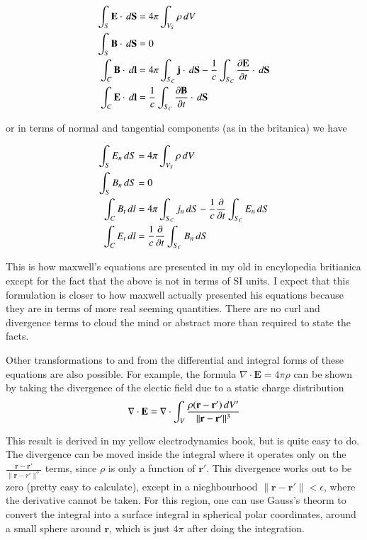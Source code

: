 \documentclass{article}      %
\newcommand{\norm}[1]{\lVert#1\rVert}
\newcommand{\diverg}[1]{\nabla \cdot #1}
\newcommand{\Diverg}[1]{\nabla \cdot \mathbf{#1}}
\newcommand{\Ddt}[1]{ {{\partial{\mathbf{#1}}} \over {\partial{t}}}}
\newcommand{\Bj}[0]{\mathbf{j}}
\newcommand{\BB}[0]{\mathbf{B}}
\newcommand{\BE}[0]{\mathbf{E}}
\newcommand{\BS}[0]{\mathbf{S}}
\begin{document}
\begin{align*}
\int_{S} \BE \cdot \, d\BS &= 4\pi \int_{V_S} \rho\, dV \\
\int_{S} \BB \cdot \, d\BS &= 0 \\
\int_{C} \BB \cdot \, d\mathbf{l} &= 4\pi \int_{S_C} \Bj \cdot \, d\BS - {1 \over c} \int_{S_C} \Ddt{E} \cdot \, d\BS \\
\int_{C} \BE \cdot \, d\mathbf{l} &= {1 \over c} \int_{S_C} \Ddt{B} \cdot \, d\BS
\end{align*}

or in terms of normal and tangential components (as in the britanica) we have

\begin{align*}
\int_{S} E_n \, dS &= 4\pi \int_{V_S} \rho\, dV \\
\int_{S} B_n \, dS &= 0 \\
\int_{C} B_t \, dl &= 4\pi \int_{S_C} j_n \, dS - {1 \over c} {{\partial} \over {\partial t}} \int_{S_C} E_n \, dS \\
\int_{C} E_t \, dl &= {1 \over c} {{\partial} \over {\partial t}} \int_{S_C} B_n \, dS
\end{align*}

This is how 
maxwell's equations are presented in my old 
in encylopedia britianica 
except for the fact that 
the above is not in terms of SI units.  I expect that this formulation is closer to how 
maxwell actually presented his equations because they are in terms of more real 
seeming quantities.  There are no curl and divergence terms to cloud the mind or
abstract more than required to state the facts.

Other transformations to and from the differential and integral forms of these
equations are also possible.  For example, the formula $\Diverg E = 4\pi\rho$ 
can be shown by taking the divergence of the electic field due to a static
charge distribution
\begin{equation*}
\diverg{\BE} = \diverg{\int_V{{\rho (\mathbf{r - r'})\,dV'} \over {\norm{\mathbf r - \mathbf r'}^3}}}
\end{equation*}

This result is derived in my yellow electrodynamics book, but is quite easy to 
do.  The divergence can be moved inside the integral where it operates only on 
the $\frac {\mathbf{r - r'}} {\norm{\mathbf r - r'}^3}$ terms, since $\rho$ is 
only a function of $\mathbf r'$.  This divergence works out to be zero 
(pretty easy to calculate), except in a nieghbourhood 
$\norm{\mathbf{r - r'}} < \epsilon$, where the derivative cannot be taken.
For this region, one can use Gauss's theorm to convert the 
integral into a surface integral in spherical polar coordinates, 
around a small sphere around $\mathbf r$, which is just $4\pi$ after doing 
the integration.
\end{document}
